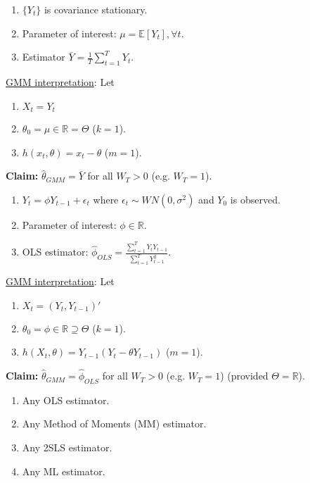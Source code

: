\documentclass[11pt]{elegantbook}
\begin{document}
\begin{example}
    \begin{enumerate}
        \item $\{Y_t\}$ is covariance stationary.
        \item Parameter of interest: $\mu=\mathbb{E}[Y_t],\forall t$.
        \item Estimator $\bar{Y}=\frac{1}{T}\sum_{t=1}^T Y_t$.
    \end{enumerate}
    \underline{GMM interpretation}: Let
    \begin{enumerate}
        \item $X_t=Y_t$
        \item $\theta_0=\mu\in \mathbb{R}=\Theta$ ($k=1$).
        \item $h(x_t,\theta)=x_t-\theta$ ($m=1$).
    \end{enumerate}
    \textbf{Claim:} $\hat{\theta}_{GMM}=\bar{Y}$ for all $W_T>0$ (e.g. $W_T=1$).
\end{example}

\begin{example}
    \begin{enumerate}
        \item $Y_t=\phi Y_{t-1}+\epsilon_t$ where $\epsilon_t\sim WN(0,\sigma^2)$ and $Y_0$ is observed.
        \item Parameter of interest: $\phi\in \mathbb{R}$.
        \item OLS estimator: $\hat{\phi}_{OLS}=\frac{\sum_{t=1}^T Y_tY_{t-1}}{\sum_{t=1}^T Y_{t-1}^2}$.
    \end{enumerate}
    \underline{GMM interpretation}: Let
    \begin{enumerate}
        \item $X_t=(Y_t,Y_{t-1})'$
        \item $\theta_0=\phi\in \mathbb{R}\supseteq \Theta$ ($k=1$).
        \item $h(X_t,\theta)=Y_{t-1}(Y_t-\theta Y_{t-1})$ ($m=1$).
    \end{enumerate}
    \textbf{Claim:} $\hat{\theta}_{GMM}=\hat{\phi}_{OLS}$ for all $W_T>0$ (e.g. $W_T=1$) (provided $\Theta= \mathbb{R}$).
\end{example}

\begin{example}
    \begin{enumerate}
        \item Any OLS estimator.
        \item Any Method of Moments (MM) estimator.
        \item Any 2SLS estimator.
        \item Any ML estimator.
    \end{enumerate}
\end{example}
\end{document}

